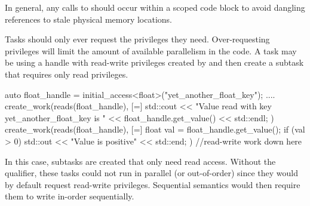 In general, any calls to  should occur 
within a scoped code block to avoid dangling references to stale physical memory locations.



Tasks should only ever request the privileges they need. 
Over-requesting privileges will limit the amount of available parallelism in the code.
A task may be using a handle with read-write privileges created by 
and then create a subtask that requires only read privileges.

\begin{CppCode}
auto float_handle = initial_access<float>("yet_another_float_key");
....
create_work(reads(float_handle), [=] {
  std::cout << "Value read with key yet_another_float_key is " 
          << float_handle.get_value() << std::endl;
})
create_work(reads(float_handle), [=] {
  float val = float_handle.get_value();
  if (val > 0) std::out << "Value is positive" << std::end;
})
//read-write work down here
\end{CppCode}
In this case, subtasks are created that only need read access. 
Without the  qualifier, these tasks could not run in parallel (or out-of-order) since they
would by default request read-write privileges.
Sequential semantics would then require them to write in-order sequentially.


